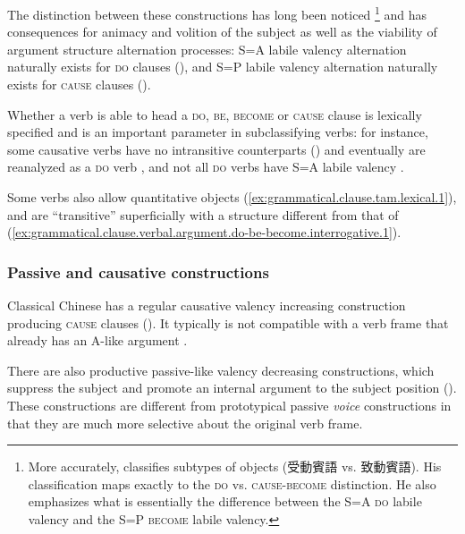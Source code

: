 \documentclass[UTF8, a4paper, oneside, scheme=plain, 12pt]{ctexrep}
\newcommand*{\citepage}[1]{p.~{#1}}
\newcommand*{\citepages}[1]{pp.~{#1}}
\newcommand*{\category}[1]{\textsc{#1}}
\begin{document}
The distinction between these constructions has long been noticed \citep[\citepages{92-96}]{li2004grammar}%
\footnote{
    More accurately, \citet{li2004grammar} classifies subtypes of objects (受動賓語 vs. 致動賓語).
    His classification maps exactly to the \category{do} vs. \category{cause}-\category{become} distinction.
    He also emphasizes what is essentially the difference between the S=A \category{do} labile valency and the S=P \category{become} labile valency.
}
and has consequences for
animacy and volition of the subject as well as the viability of argument structure alternation processes: S=A labile valency alternation naturally exists for \category{do} clauses (),
and S=P labile valency alternation naturally exists for \category{cause} clauses ().

Whether a verb is able to head a \category{do}, \category{be}, \category{become} or \category{cause} clause is  lexically specified
and is an important parameter in subclassifying verbs:
for instance, some causative verbs have no intransitive counterparts () and eventually are reanalyzed as a \category{do} verb \citep[\citepages{269-271}]{meiguang2018},
and not all \category{do} verbs have S=A labile valency \citep[\citepage{93}]{li2004grammar}.

Some verbs also allow quantitative objects (\ref{ex:grammatical.clause.tam.lexical.1}),
and are ``transitive'' superficially with a structure different from that of (\ref{ex:grammatical.clause.verbal.argument.do-be-become.interrogative.1}).

\subsubsection{Passive and causative constructions}\label{sec:grammatical.clause.verbal.argument.valency-change}

Classical Chinese has a regular causative valency increasing construction producing \category{cause} clauses
().
It typically is not compatible with a verb frame that already has an A-like argument \citep[\citepage{364}]{meiguang2018}.

There are also productive passive-like valency decreasing constructions, which suppress the subject 
and promote an internal argument to the subject position ().
These constructions are different from prototypical passive \emph{voice} constructions
in that they are much more selective about the original verb frame.
\end{document}
